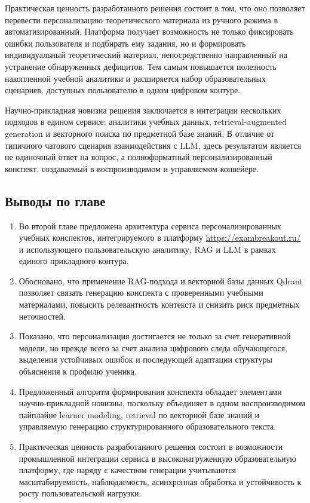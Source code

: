 \documentclass[a4paper,12pt]{extarticle}
\begin{document}
Практическая ценность разработанного решения состоит в том, что оно позволяет перевести 
персонализацию теоретического материала из ручного режима в автоматизированный. Платформа 
получает возможность не только фиксировать ошибки пользователя и подбирать ему задания, 
но и формировать индивидуальный теоретический материал, непосредственно направленный на 
устранение обнаруженных дефицитов. Тем самым повышается полезность накопленной учебной 
аналитики и расширяется набор образовательных сценариев, доступных пользователю в одном 
цифровом контуре.

Научно-прикладная новизна решения заключается в интеграции нескольких подходов в едином 
сервисе: аналитики учебных данных, retrieval-augmented generation и векторного поиска по 
предметной базе знаний. В отличие от типичного чатового сценария взаимодействия с LLM, 
здесь результатом является не одиночный ответ на вопрос, а полноформатный персонализированный 
конспект, создаваемый в воспроизводимом и управляемом конвейере.

\subsection{Выводы по главе}

\begin{enumerate}
    \item Во второй главе предложена архитектура сервиса персонализированных учебных 
	конспектов, интегрируемого в платформу \url{https://exambreakout.ru/} и использующего 
	пользовательскую аналитику, RAG и LLM в рамках единого прикладного контура.
    \item Обосновано, что применение RAG-подхода и векторной базы данных Qdrant позволяет 
	связать генерацию конспекта с проверенными учебными материалами, повысить релевантность 
	контекста и снизить риск предметных неточностей.
    \item Показано, что персонализация достигается не только за счет генеративной модели, 
	но прежде всего за счет анализа цифрового следа обучающегося, выделения устойчивых ошибок 
	и последующей адаптации структуры объяснения к профилю ученика.
    \item Предложенный алгоритм формирования конспекта обладает элементами научно-прикладной 
	новизны, поскольку объединяет в одном воспроизводимом пайплайне learner modeling, 
	retrieval по векторной базе знаний и управляемую генерацию структурированного 
	образовательного текста.
    \item Практическая ценность разработанного решения состоит в возможности промышленной 
	интеграции сервиса в высоконагруженную образовательную платформу, где наряду с качеством 
	генерации учитываются масштабируемость, наблюдаемость, асинхронная обработка и 
	устойчивость к росту пользовательской нагрузки.
\end{enumerate}
\pagebreak
\end{document}
